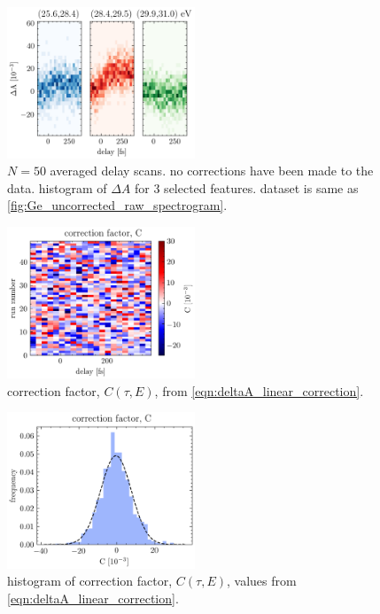 \begin{figure}
	\centering
	\includegraphics[width=0.5\textwidth]{figures/chap3/uncorrected_hist.png}
	\caption{$N=50$ averaged delay scans. no corrections have been made to the data. histogram of $\Delta A$ for 3 selected features. dataset is same as \cref{fig:Ge_uncorrected_raw_spectrogram}.}
	\label{fig:uncorrected_hist}
\end{figure}

\begin{figure}
	\centering
	\includegraphics[width=0.5\textwidth]{figures/chap3/C_factor_image.png}
	\caption{correction factor, $C(\tau,E)$, from \cref{eqn:deltaA_linear_correction}.}
	\label{fig:C_factor_image}
\end{figure}

\begin{figure}
	\centering
	\includegraphics[width=0.5\textwidth]{figures/chap3/C_factor_hist.png}
	\caption{histogram of correction factor, $C(\tau,E)$, values from \cref{eqn:deltaA_linear_correction}.}
	\label{fig:C_factor_hist}
\end{figure}

